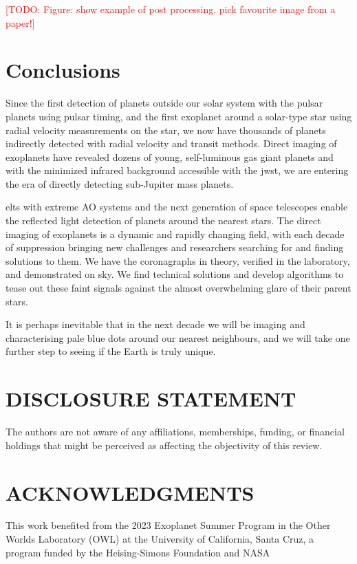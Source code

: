\documentclass[letterpaper]{ar-1col}
\newcommand{\todo}[1]{\textcolor{red}{[TODO: #1]}}
\begin{document}

\todo{Figure: show example of post processing. pick favourite image from a paper!}

\section{Conclusions}

Since the first detection of planets outside our solar system with the pulsar planets \citep{Wolszczan92} using pulsar timing, and the first exoplanet around a solar-type star \citep[51 Peg b; ][]{Mayor95} using radial velocity measurements on the star, we now have thousands of planets indirectly detected with radial velocity and transit methods.
%
Direct imaging of exoplanets have revealed dozens of young, self-luminous gas giant planets \citep{Currie23,Chauvin24} and with the minimized infrared background accessible with the \ac{jwst}, we are entering the era of directly detecting sub-Jupiter mass planets.

\acp{elt} with extreme AO systems and the next generation of space telescopes enable the reflected light detection of planets around the nearest stars.
%
The direct imaging of exoplanets is a dynamic and rapidly changing field, with each decade of suppression bringing new challenges and researchers searching for and finding solutions to them.
%
We have the coronagraphs in theory, verified in the laboratory, and demonstrated on sky.
%
We find technical solutions and develop algorithms to tease out these faint signals against the almost overwhelming glare of their parent stars.

It is perhaps inevitable that in the next decade we will be imaging and characterising pale blue dots around our nearest neighbours, and we will take one further step to seeing if the Earth is truly unique.

\section*{DISCLOSURE STATEMENT}
The authors are not aware of any affiliations, memberships, funding, or financial holdings that
might be perceived as affecting the objectivity of this review.

\section*{ACKNOWLEDGMENTS}
This work benefited from the 2023 Exoplanet Summer Program in the Other Worlds Laboratory (OWL) at the University of California, Santa Cruz, a program funded by the Heising-Simons Foundation and NASA
%
\end{document}
